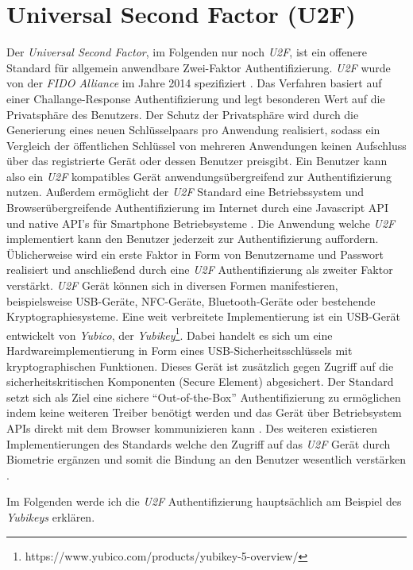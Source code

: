 \documentclass[11pt,a4paper,ngerman]{scrreprt}
\begin{document}
\section{Universal Second Factor (U2F)}
Der \textit{Universal Second Factor}, im Folgenden nur noch \textit{U2F}, ist ein offenere Standard für allgemein anwendbare Zwei-Faktor Authentifizierung. \textit{U2F} wurde von der \textit{FIDO Alliance} im Jahre 2014 spezifiziert \cite{u2fv1}. Das Verfahren basiert auf einer Challange-Response Authentifizierung und legt besonderen Wert auf die Privatsphäre des Benutzers. Der Schutz der Privatsphäre wird durch die Generierung eines neuen Schlüsselpaars pro Anwendung realisiert, sodass ein Vergleich der öffentlichen Schlüssel von mehreren Anwendungen keinen Aufschluss über das registrierte Gerät oder dessen Benutzer preisgibt. Ein Benutzer kann also ein \textit{U2F} kompatibles Gerät anwendungsübergreifend zur Authentifizierung nutzen. Außerdem ermöglicht der \textit{U2F} Standard eine Betriebssystem und Browserübergreifende Authentifizierung im Internet durch eine Javascript API und native API's für Smartphone Betriebsysteme \cite{u2fSpec}. Die Anwendung welche \textit{U2F} implementiert kann den Benutzer jederzeit zur Authentifizierung auffordern. Üblicherweise wird ein erste Faktor in Form von Benutzername und Passwort realisiert und anschließend durch eine \textit{U2F} Authentifizierung als zweiter Faktor verstärkt. \textit{U2F} Gerät können sich in diversen Formen manifestieren, beispielsweise USB-Geräte, NFC-Geräte, Bluetooth-Geräte oder bestehende Kryptographiesysteme. Eine weit verbreitete Implementierung ist ein USB-Gerät entwickelt von \textit{Yubico}, der \textit{Yubikey}\footnote{https://www.yubico.com/products/yubikey-5-overview/}. Dabei handelt es sich um eine Hardwareimplementierung in Form eines USB-Sicherheitsschlüssels mit kryptographischen Funktionen. Dieses Gerät ist zusätzlich gegen Zugriff auf die sicherheitskritischen Komponenten (Secure Element) abgesichert. Der Standard setzt sich als Ziel eine sichere ``Out-of-the-Box'' Authentifizierung zu ermöglichen indem keine weiteren Treiber benötigt werden und das Gerät über Betriebsystem APIs direkt mit dem Browser kommunizieren kann \cite{u2fSpec}. Des weiteren existieren Implementierungen des Standards welche den Zugriff auf das \textit{U2F} Gerät durch Biometrie ergänzen und somit die Bindung an den Benutzer wesentlich verstärken \cite{eyelock}.

Im Folgenden werde ich die \textit{U2F} Authentifizierung hauptsächlich am Beispiel des \textit{Yubikeys} erklären.
\end{document}
